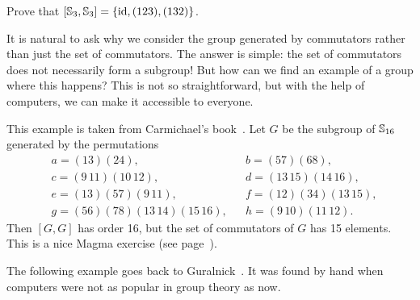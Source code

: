 \begin{exercise}
        Prove that $[\mathbb{S}_3,\mathbb{S}_3]=\{\operatorname{id},(123),(132)\}$.
\end{exercise}
        
\begin{optional}
It is natural to ask why we consider the group generated by commutators rather
than just the set of commutators. The answer is simple: the set of commutators
does not necessarily form a subgroup! But how can we find an example of a group
where this happens? This is not so straightforward, but with the help of
computers, we can make it accessible to everyone.

\begin{example}
\label{exa:Carmichael}
This example is taken from Carmichael's book~\cite{MR0075938}.
        Let $G$ be the subgroup of $\mathbb{S}_{16}$ 
        generated by the permutations 
        \begin{align*}
&a = (13)(24),&&
b = (57)(68),\\
&c = (9\,11)(10\,12),&&
d = (13\,15)(14\,16),\\
&e = (13)(57)(9\,11),&&
f = (12)(34)(13\,15),\\
&g = (56)(78)(13\,14)(15\,16),&&
h = (9\,10)(11\,12).
\end{align*}
Then $[G,G]$ has order 16, but the set of commutators of 
$G$ has 15 elements. This is a nice Magma exercise (see page~\pageref{magma:Carmichael}).  
\end{example}

The following example goes back to Guralnick~\cite{MR673806}. 
It was found by hand when computers were not as popular
in group theory as now. 


\end{optional}
